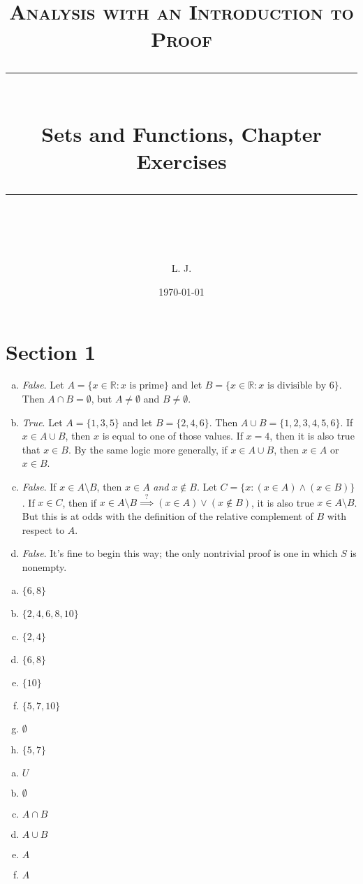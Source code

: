 \documentclass[12pt]{scrartcl} %
\title{	
	\normalfont\normalsize
	\textsc{Analysis with an Introduction to Proof}\\ %
	\vspace{25pt} %
	\rule{\linewidth}{0.5pt}\\ %
	\vspace{20pt} %
	{\huge Sets and Functions, Chapter Exercises}\\ %
	\vspace{12pt} %
	\rule{\linewidth}{2pt}\\ %
	\vspace{12pt} %
}
\author{\LARGE L. J.} %
\date{\normalsize\today} %
\begin{document}
\maketitle %

\section{Section 1}

\begin{enumerate}[(a)]
	\item \emph{False}. Let $A = \{x \in \mathbb{R}: x \text{ is prime}\}$ and let $B = \{x \in \mathbb{R}: x \text{ is divisible by 6} \}$. Then $A \cap B = \emptyset$, but $A \neq \emptyset$ and $B \neq \emptyset$.
	\item \emph{True}. Let $A = \{1, 3, 5\}$ and let $B = \{2, 4, 6\}$. Then $A \cup B = \{1, 2, 3, 4, 5, 6\}$. If $x \in A \cup B$, then $x$ is equal to one of those values. If $x = 4$, then it is also true that $x \in B$. By the same logic more generally, if $x \in A \cup B$, then $x \in A$ or $x \in B$.
	\item \emph{False}. If $x \in A\setminus B$, then $x \in A$ \emph{and} $x \notin B$. Let $C = \{x: (x \in A) \land (x \in B)\}$. If $x \in C$, then if $x \in A\setminus B \stackrel{?}{\implies} (x \in A) \lor (x \notin B)$, it is also true $x \in A\setminus B$. But this is at odds with the definition of the relative complement of $B$ with respect to $A$.
	\item \emph{False}. It's fine to begin this way; the only nontrivial proof is one in which $S$ is nonempty.
\end{enumerate}

\begin{enumerate}[(a)]
	\item $\{6,8\}$
	\item $\{2,4,6,8,10\}$
	\item $\{2,4\}$
	\item $\{6,8\}$
	\item $\{10\}$
	\item $\{5,7,10\}$
	\item $\emptyset$
	\item $\{5,7\}$
\end{enumerate}

\begin{enumerate}[(a)]
	\item $U$
	\item $\emptyset$
	\item $A \cap B$
	\item $A \cup B$
	\item $A$
	\item $A$
\end{enumerate}
\end{document}
